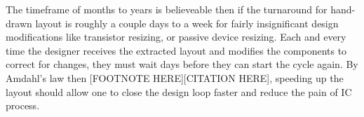 The timeframe of months to years is believeable then if the turnaround for hand-drawn layout is roughly a couple days to a week for fairly insignificant design modifications like transistor resizing, or passive device resizing. Each and every time the designer receives the extracted layout and modifies the components to correct for changes, they must wait days before they can start the cycle again. By Amdahl's law then [FOOTNOTE HERE][CITATION HERE], speeding up the layout should allow one to close the design loop faster and reduce the pain of IC process.
%





%

